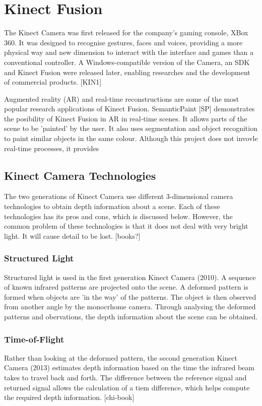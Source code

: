 \documentclass[11pt,openright,a4paper]{report}
\begin{document}
\chapter{Kinect Fusion}
The Kinect Camera was first released for the company's gaming console, XBox 360. It was designed to recognise gestures, faces and voices, providing a more physical way and new dimension to interact with the interface and games than a conventional controller. A Windows-compatible version of the Camera, an SDK and Kinect Fusion were released later, enabling researches and the development of commercial products. [KIN1] 

Augmented reality (AR) and real-time reconstructions are some of the most popular research applications of Kinect Fusion. SemanticPaint [SP] demonstrates the posibility of Kinect Fusion in AR in real-time scenes. It allows parts of the scene to be 'painted' by the user. It also uses segmentation and object recognition to paint similar objects in the same colour. Although this project does not invovle real-time processes, it provides

\section{Kinect Camera Technologies}
The two generations of Kinect Camera use different 3-dimensional camera technologies to obtain depth information about a scene. Each of these technologies has its pros and cons, which is discussed below. However, the common problem of these technologies is that it does not deal with very bright light. It will cause detail to be lost. [books?]

\subsection{Structured Light}
Structured light is used in the first generation Kinect Camera (2010). A sequence of known infrared patterns are projected onto the scene. A deformed pattern is formed when objects are 'in the way' of the patterns. The object is then observed from another angle by the monocrhome camera. Through analysing the deformed patterns and obervations, the depth information about the scene can be obtained. \cite{chi-book} \cite{kinect-cam-tech}

\subsection{Time-of-Flight}
Rather than looking at the deformed pattern, the second generation Kinect Camera (2013) estimates depth information based on the time the infrared beam takes to travel back and forth. The difference between the reference signal and returned signal allows the calculation of a tiem difference, which helps compute the required depth information. [chi-book] 
\end{document}
